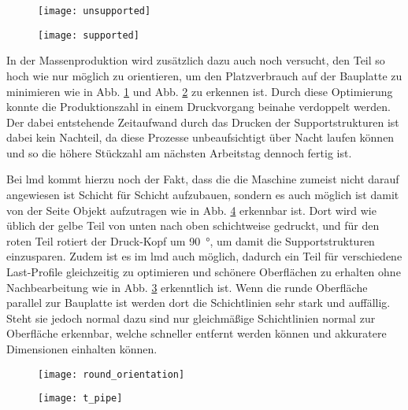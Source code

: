 \documentclass[../main.tex]{subfiles}
\begin{document}
\begin{figure}[h]
	\centering
	\texttt{[image: unsupported]}
	\label{img:unsupp_1}
\end{figure}
\begin{figure}[h]
	\centering
	\texttt{[image: supported]}
	\label{img:supp_1}
\end{figure}
In der Massenproduktion wird zusätzlich dazu auch noch versucht, den Teil so hoch wie nur möglich zu orientieren, um den Platzverbrauch auf der Bauplatte zu minimieren wie in Abb. \ref{img:unsupp_1} und Abb. \ref{img:supp_1} zu erkennen ist. Durch diese Optimierung konnte die Produktionszahl in einem Druckvorgang beinahe verdoppelt werden. Der dabei entstehende Zeitaufwand durch das Drucken der Supportstrukturen ist dabei kein Nachteil, da diese Prozesse unbeaufsichtigt über Nacht laufen können und so die höhere Stückzahl am nächsten Arbeitstag dennoch fertig ist. \cite{lim2015}

Bei \acrfull{lmd} kommt hierzu noch der Fakt, dass die die Maschine zumeist nicht darauf angewiesen ist Schicht für Schicht aufzubauen, sondern es auch möglich ist damit von der Seite Objekt aufzutragen wie in Abb. \ref{img:t_pipe} erkennbar ist. Dort wird wie üblich der gelbe Teil von unten nach oben schichtweise gedruckt, und für den roten Teil rotiert der Druck-Kopf um \qty{90}{\degree}, um damit die Supportstrukturen einzusparen. Zudem ist es im \acrshort{lmd} auch möglich, dadurch ein Teil für verschiedene Last-Profile gleichzeitig zu optimieren und schönere Oberflächen zu erhalten ohne Nachbearbeitung wie in Abb. \ref{img:round_orient} erkenntlich ist. Wenn die runde Oberfläche parallel zur Bauplatte ist werden dort die Schichtlinien sehr stark und auffällig. Steht sie jedoch normal dazu sind nur gleichmäßige Schichtlinien normal zur Oberfläche erkennbar, welche schneller entfernt werden können und akkuratere Dimensionen einhalten können.
\begin{figure}[H]
	\centering
	\texttt{[image: round\_orientation]}

	\label{img:round_orient}
\end{figure}
\begin{figure}[h]
	\centering
	\texttt{[image: t\_pipe]}
	\label{img:t_pipe}
\end{figure}
\end{document}
